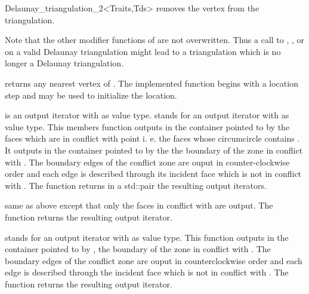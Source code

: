 \begin{ccRefClass}{Delaunay_triangulation_2<Traits,Tds>}
{removes the vertex from the triangulation.}

Note that the other modifier functions  of
 are not overwritten.
Thus a  call to 
, ,
  or 
on a valid Delaunay triangulation might lead to a triangulation
which is no longer a Delaunay triangulation.


{returns any nearest vertex of . The implemented function
begins with a location step and
 may be used to initialize the location.}

{  is an output iterator with  as value type.
 stands for an output iterator with  as value type.
This members function outputs in the container pointed to by 
the faces which are in conflict with point 
i. e. the faces whose circumcircle contains .
It outputs in the container pointed to by  the 
the boundary of the zone in conflict with .
The boundary edges
of the conflict  zone are ouput in counter-clockwise order
and each edge is described  through its incident face
which is not in conflict with .
The function returns in a std::pair the resulting output iterators.}

{same as above except that only the faces in conflict with 
are output. The function returns the resulting output iterator.}

{  stands for an output iterator with 
 as value
type.
 This function  outputs in the container pointed to by ,
the boundary of the zone in conflict with . The boundary edges
of the conflict  zone are ouput in counterclockwise order
and each edge is described  through the incident face
which is not in conflict with .
The function returns the resulting output iterator.}



\end{ccRefClass}
